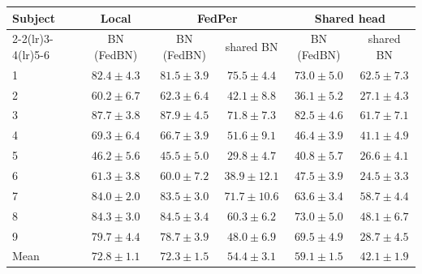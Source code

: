 \begin{tabular}{lccccc}
\toprule
Subject & \multicolumn{1}{c}{Local} & \multicolumn{2}{c}{FedPer} & \multicolumn{2}{c}{Shared head} \\
\cmidrule(lr){2-2}\cmidrule(lr){3-4}\cmidrule(lr){5-6}
 & BN (FedBN) & BN (FedBN) & shared BN & BN (FedBN) & shared BN \\
\midrule
1 & $\mathbf{82.4} \pm 4.3$ & $81.5 \pm 3.9$ & $75.5 \pm 4.4$ & $73.0 \pm 5.0$ & $62.5 \pm 7.3$ \\
2 & $60.2 \pm 6.7$ & $\mathbf{62.3} \pm 6.4$ & $42.1 \pm 8.8$ & $36.1 \pm 5.2$ & $27.1 \pm 4.3$ \\
3 & $87.7 \pm 3.8$ & $\mathbf{87.9} \pm 4.5$ & $71.8 \pm 7.3$ & $82.5 \pm 4.6$ & $61.7 \pm 7.1$ \\
4 & $\mathbf{69.3} \pm 6.4$ & $66.7 \pm 3.9$ & $51.6 \pm 9.1$ & $46.4 \pm 3.9$ & $41.1 \pm 4.9$ \\
5 & $\mathbf{46.2} \pm 5.6$ & $45.5 \pm 5.0$ & $29.8 \pm 4.7$ & $40.8 \pm 5.7$ & $26.6 \pm 4.1$ \\
6 & $\mathbf{61.3} \pm 3.8$ & $60.0 \pm 7.2$ & $38.9 \pm 12.1$ & $47.5 \pm 3.9$ & $24.5 \pm 3.3$ \\
7 & $\mathbf{84.0} \pm 2.0$ & $83.5 \pm 3.0$ & $71.7 \pm 10.6$ & $63.6 \pm 3.4$ & $58.7 \pm 4.4$ \\
8 & $84.3 \pm 3.0$ & $\mathbf{84.5} \pm 3.4$ & $60.3 \pm 6.2$ & $73.0 \pm 5.0$ & $48.1 \pm 6.7$ \\
9 & $\mathbf{79.7} \pm 4.4$ & $78.7 \pm 3.9$ & $48.0 \pm 6.9$ & $69.5 \pm 4.9$ & $28.7 \pm 4.5$ \\
\midrule
Mean & $\mathbf{72.8} \pm 1.1$ & $72.3 \pm 1.5$ & $54.4 \pm 3.1$ & $59.1 \pm 1.5$ & $42.1 \pm 1.9$ \\
\bottomrule
\end{tabular}
